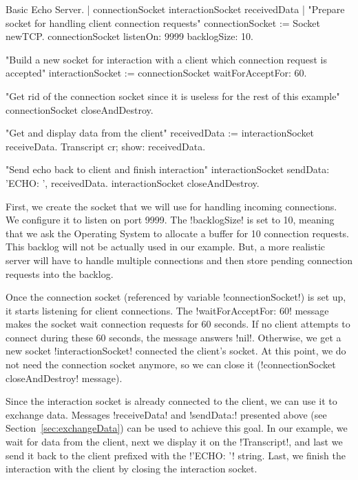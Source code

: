 \documentclass[a4paper,10pt,twoside]{book}
\begin{document}
\begin{script}[servingBasicExample]{Basic Echo Server.}
| connectionSocket interactionSocket receivedData |
"Prepare socket for handling client connection requests"
connectionSocket := Socket newTCP.
connectionSocket listenOn: 9999 backlogSize: 10.

"Build a new socket for interaction with a client which connection request is accepted"
interactionSocket := connectionSocket waitForAcceptFor: 60.

"Get rid of the connection socket since it is useless for the rest of this example"
connectionSocket closeAndDestroy.

"Get and display data from the client"
receivedData := interactionSocket receiveData.
Transcript cr; show: receivedData.

"Send echo back to client and finish interaction"
interactionSocket sendData: 'ECHO: ', receivedData.
interactionSocket closeAndDestroy.
\end{script}

First, we create the socket that we will use for handling incoming connections.
We configure it to listen on port 9999.
The \ct!backlogSize! is set to 10, meaning that we ask the Operating System to allocate a buffer for 10 connection requests. 
This backlog will not be actually used in our example.
But, a more realistic server will have to handle multiple connections and then store pending connection requests into the backlog.

Once the connection socket (referenced by variable \ct!connectionSocket!) is set up, it starts listening for client connections.
The \ct!waitForAcceptFor: 60! message makes the socket wait connection requests for 60 seconds.
If no client attempts to connect during these 60 seconds, the message answers \ct!nil!.
Otherwise, we get a new socket \ct!interactionSocket! connected the client's socket.
At this point, we do not need the connection socket anymore, so we can close it (\ct!connectionSocket closeAndDestroy! message).

Since the interaction socket is already connected to the client, we can use it to exchange data.
Messages \ct!receiveData! and \ct!sendData:! presented above (see Section~\ref{sec:exchangeData}) can be used to achieve this goal.
In our example, we wait for data from the client, next we display it on the \ct!Transcript!, and last we send it back to the client prefixed with the \ct!'ECHO: '! string.
Last, we finish the interaction with the client by closing the interaction socket.
\end{document}
